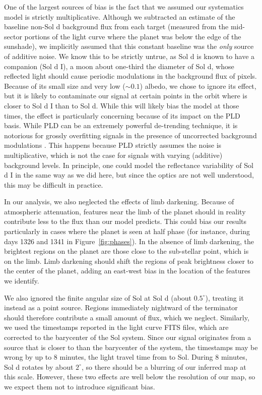 \documentclass[modern]{aastex62}
\begin{document}
One of the largest sources of bias is the fact that we assumed our
systematics model is strictly multiplicative. Although we subtracted
an estimate of the baseline non-Sol d background flux from each target
(measured from the mid-sector portions of the light curve where the
planet was below the edge of the sunshade), we implicitly assumed
that this constant baseline was the \emph{only} source of additive
noise. We know this to be strictly untrue, as Sol d is known to
have a companion (Sol d I), a moon about one-third the diameter of 
Sol d, whose reflected light should cause periodic modulations
in the background flux of \TESS pixels. Because of its small size and
very low ($\sim 0.1$) albedo, we chose to ignore its effect, but it
is likely to contaminate our signal at certain points in the orbit
where \TESS is closer to Sol d I than to Sol d. While this will
likely bias the \starry model at those times, the effect is particularly
concerning because of its impact on the PLD basis. While PLD can be an
extremely powerful de-trending technique, it is notorious for
grossly overfitting signals in the presence of uncorrected background
modulations \citep{Luger2016}. This happens because PLD strictly
assumes the noise is multiplicative, which is not the case for 
signals with varying (additive) background levels. In principle, one
could model the reflectance variability of Sol d I in the same way as
we did here, but since the optics are not well understood, this 
may be difficult in practice. 

In our analysis, we also neglected the effects of limb darkening. Because of
atmospheric attenuation, features near the limb of the planet should in
reality contribute less to the flux than our model predicts. This could
bias our results particularly in cases where the planet is seen at half
phase (for instance, during days 1326 and 1341 in Figure~\ref{fig:phases}).
In the absence of limb darkening, the brightest regions on the planet are those
close to the sub-stellar point, which is on the limb. Limb darkening should
shift the regions of peak brightness closer to the center of the planet, adding
an east-west bias in the location of the features we identify.

We also ignored the finite angular size of Sol at Sol d (about $0.5^\circ$),
treating it instead as a point source. Regions immediately nightward of the 
terminator should therefore contribute a small amount of flux, which we neglect.
Similarly, we used the timestamps reported in the \tess light curve
FITS files, which are corrected to the barycenter of the Sol system. Since
our signal originates from a source that is closer to \tess than the
barycenter of the system, the timestamps may be wrong by up to 8 minutes,
the light travel time from \tess to Sol. During 8 minutes, Sol d rotates
by about $2^\circ$, so there should be a blurring of our inferred map at
this scale. However, these two effects
are well below the resolution of our map, so we expect
them not to introduce significant bias.
\end{document}
